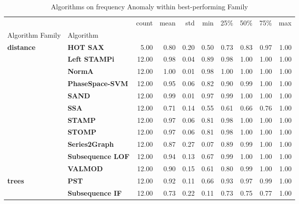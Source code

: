 \begin{table}
\caption{Algorithms on frequency Anomaly within best-performing Family}
\label{tab:bp-frequency}
\begin{tabular}{llrrrrrrrr}
\toprule
 &  & count & mean & std & min & 25\% & 50\% & 75\% & max \\
Algorithm Family & Algorithm &  &  &  &  &  &  &  &  \\
\midrule
\multirow[t]{11}{*}{\textbf{distance}} & \textbf{HOT SAX} & 5.00 & 0.80 & 0.20 & 0.50 & 0.73 & 0.83 & 0.97 & 1.00 \\
\textbf{} & \textbf{Left STAMPi} & 12.00 & 0.98 & 0.04 & 0.89 & 0.98 & 1.00 & 1.00 & 1.00 \\
\textbf{} & \textbf{NormA} & 12.00 & 1.00 & 0.01 & 0.98 & 1.00 & 1.00 & 1.00 & 1.00 \\
\textbf{} & \textbf{PhaseSpace-SVM} & 12.00 & 0.95 & 0.06 & 0.82 & 0.90 & 0.99 & 1.00 & 1.00 \\
\textbf{} & \textbf{SAND} & 12.00 & 0.99 & 0.01 & 0.97 & 0.99 & 1.00 & 1.00 & 1.00 \\
\textbf{} & \textbf{SSA} & 12.00 & 0.71 & 0.14 & 0.55 & 0.61 & 0.66 & 0.76 & 1.00 \\
\textbf{} & \textbf{STAMP} & 12.00 & 0.97 & 0.06 & 0.81 & 0.98 & 1.00 & 1.00 & 1.00 \\
\textbf{} & \textbf{STOMP} & 12.00 & 0.97 & 0.06 & 0.81 & 0.98 & 1.00 & 1.00 & 1.00 \\
\textbf{} & \textbf{Series2Graph} & 12.00 & 0.87 & 0.27 & 0.07 & 0.89 & 0.99 & 1.00 & 1.00 \\
\textbf{} & \textbf{Subsequence LOF} & 12.00 & 0.94 & 0.13 & 0.67 & 0.99 & 1.00 & 1.00 & 1.00 \\
\textbf{} & \textbf{VALMOD} & 12.00 & 0.90 & 0.15 & 0.61 & 0.80 & 0.99 & 1.00 & 1.00 \\
\cline{1-10}
\multirow[t]{2}{*}{\textbf{trees}} & \textbf{PST} & 12.00 & 0.92 & 0.11 & 0.66 & 0.93 & 0.97 & 0.99 & 1.00 \\
\textbf{} & \textbf{Subsequence IF} & 12.00 & 0.73 & 0.22 & 0.11 & 0.73 & 0.75 & 0.77 & 1.00 \\
\cline{1-10}
\bottomrule
\end{tabular}
\end{table}
